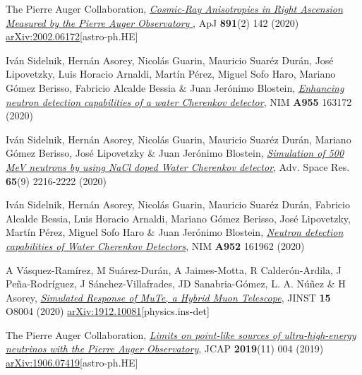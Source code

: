 \begin{etaremune}
\item {}The Pierre Auger Collaboration, \href{https://doi.org/10.3847/1538-4357/ab7236}{\emph{Cosmic-Ray Anisotropies in Right Ascension Measured by the Pierre Auger Observatory
}}, ApJ {\bf{891}}(2) 142 (2020) \href{https://arxiv.org/abs/2002.06172}{arXiv:2002.06172}[astro-ph.HE]

\item {} Iván Sidelnik, Hernán Asorey, Nicolás Guarin, Mauricio Suaréz Durán, José Lipovetzky, Luis Horacio Arnaldi, Martín Pérez, Miguel Sofo Haro, Mariano Gómez Berisso, Fabricio Alcalde Bessia \& Juan Jerónimo Blostein, \href{https://doi.org/10.1016/j.nima.2019.163172}{\emph{Enhancing neutron detection capabilities of a water Cherenkov detector}}, NIM {\bf{A955}} 163172 (2020) %
	
\item {} Iván Sidelnik, Hernán Asorey, Nicolás Guarin, Mauricio Suaréz Durán, Mariano Gómez Berisso, José Lipovetzky \& Juan Jerónimo Blostein, \href{https://doi.org/10.1016/j.asr.2020.02.024}{\emph{Simulation of 500 MeV neutrons by using NaCl doped Water Cherenkov detector}}, Adv. Space Res. {\bf{65}}(9) 2216-2222 (2020) %

\item {} Iván Sidelnik, Hernán Asorey, Nicolás Guarin, Mauricio Suaréz Durán, Fabricio Alcalde Bessia, Luis Horacio Arnaldi, Mariano Gómez Berisso, José Lipovetzky, Martín Pérez, Miguel Sofo Haro \& Juan Jerónimo Blostein, \href{https://doi.org/10.1016/j.nima.2019.03.017}{\emph{Neutron detection capabilities of Water Cherenkov Detectors}}, NIM {\bf{A952}} 161962 (2020) %

\item {} A Vásquez-Ramírez, M Suárez-Durán, A Jaimes-Motta, R Calderón-Ardila, J Peña-Rodríguez, J Sánchez-Villafrades, JD Sanabria-Gómez, L. A. Núñez \& H Asorey, \href{https://doi.org/10.1088/1748-0221/15/08/P08004}{\emph{Simulated Response of MuTe, a Hybrid Muon Telescope}}, JINST {\bf{15}} O8004 (2020) \href{https://arxiv.org/abs/1912.10081}{arXiv:1912.10081}[physics.ins-det]

\item {}The Pierre Auger Collaboration, \href{https://doi.org/10.1088/1475-7516/2019/11/004}{\emph{Limits on point-like sources of ultra-high-energy neutrinos with the Pierre Auger Observatory}}, JCAP {\bf{2019}}(11) 004 (2019) \href{https://arxiv.org/abs/1906.07419}{arXiv:1906.07419}[astro-ph.HE]


\end{etaremune}
